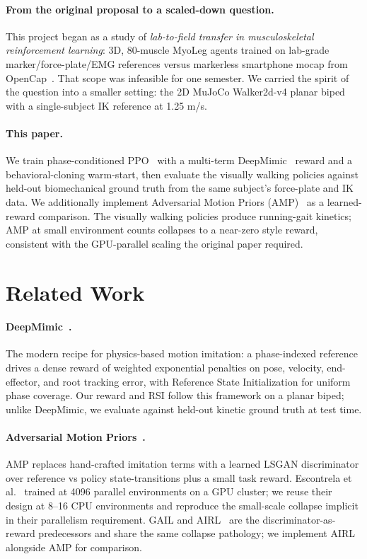 \documentclass{article}
\begin{document}
\paragraph{From the original proposal to a scaled-down question.}
This project began as a study of \emph{lab-to-field transfer in
musculoskeletal reinforcement learning}: 3D, 80-muscle MyoLeg
agents trained on lab-grade marker/force-plate/EMG references
versus markerless smartphone mocap from
OpenCap~\cite{uhlrich2023opencap}. That scope was infeasible for
one semester. We carried the spirit of the question into a
smaller setting: the 2D MuJoCo Walker2d-v4 planar
biped~\cite{todorov2012mujoco} with a single-subject IK reference
at 1.25 m/s.

\paragraph{This paper.}
We train phase-conditioned PPO~\cite{schulman2017ppo,raffin2021sb3}
with a multi-term DeepMimic~\cite{peng2018deepmimic} reward and a
behavioral-cloning warm-start, then evaluate the visually walking
policies against held-out biomechanical ground truth from the
same subject's force-plate and IK data. We additionally implement
Adversarial Motion Priors (AMP)~\cite{peng2021amp,escontrela2022amp}
as a learned-reward comparison. The visually walking policies
produce running-gait kinetics; AMP at small environment counts
collapses to a near-zero style reward, consistent with the
GPU-parallel scaling the original paper required.

\section{Related Work}
\label{sec:related}

\paragraph{DeepMimic~\cite{peng2018deepmimic}.}
The modern recipe for physics-based motion imitation: a
phase-indexed reference drives a dense reward of weighted
exponential penalties on pose, velocity, end-effector, and root
tracking error, with Reference State Initialization for uniform
phase coverage. Our reward and RSI follow this framework on a
planar biped; unlike DeepMimic, we evaluate against held-out
kinetic ground truth at test time.

\paragraph{Adversarial Motion Priors~\cite{peng2021amp,escontrela2022amp}.}
AMP replaces hand-crafted imitation terms with a learned LSGAN
discriminator over reference vs policy state-transitions plus a
small task reward. Escontrela et al.~\cite{escontrela2022amp}
trained at 4096 parallel environments on a GPU cluster; we reuse
their design at 8--16 CPU environments and reproduce the
small-scale collapse implicit in their parallelism requirement.
GAIL and AIRL~\cite{ho2016gail,fu2018airl} are the
discriminator-as-reward predecessors and share the same collapse
pathology; we implement AIRL alongside AMP for comparison.
\end{document}
